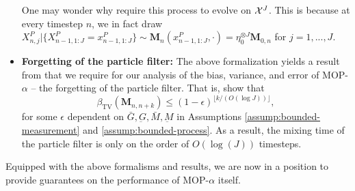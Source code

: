 \begin{itemize}
One may wonder why \cite{karjalainen23} require this process to evolve on ${\mathcal{X}}^{J}$. This is because at every timestep $n$, we in fact draw $X_{n, j}^P | \{X_{n-1, 1:J}^P = x_{n-1, 1:J}^P\} \sim \textbf{M}_n(x_{n-1, 1:J}^P, \cdot) = \eta_0^{\otimes J} \textbf{M}_{0,n}$ for $j=1,...,J$. 
\item \textbf{Forgetting of the particle filter:} 
The above formalization yields a result from \cite{karjalainen23} that we require for our analysis of the bias, variance, and error of MOP-$\alpha$ -- the forgetting of the particle filter. That is, \cite{karjalainen23} show that
$$\beta_{\mathrm{TV}}\left(\mathbf{M}_{n, n+k}\right) \leq(1-\epsilon)^{\lfloor k /(O(\log J))\rfloor},$$
for some $\epsilon$ dependent on $\bar{G}, \underbar{G}, \bar{M}, \underbar{M}$ in Assumptions \ref{assump:bounded-measurement} and \ref{assump:bounded-process}. As a result, the mixing time of the particle filter is only on the order of $O(\log(J))$ timesteps. 
\end{itemize}



Equipped with the above formalisms and results, we are now in a position to provide guarantees on the performance of MOP-$\alpha$ itself. 